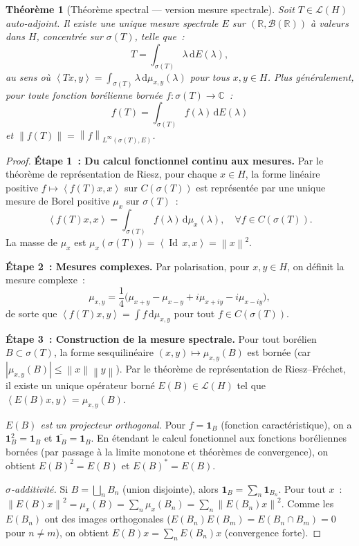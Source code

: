 \documentclass[a4paper,12pt]{book}
\DeclareMathOperator{\Id}{Id}
\newcommand{\R}{\mathbb{R}}
\newcommand{\C}{\mathbb{C}}
\newcommand{\dd}{\mathrm{d}}
\newcommand{\norm}[1]{\left\| #1 \right\|}
\newcommand{\abs}[1]{\left| #1 \right|}
\newcommand{\inner}[2]{\left\langle #1, #2 \right\rangle}
\theoremstyle{definition}
\theoremstyle{plain}
\newtheorem{theoreme}[definition]{Théorème}
\theoremstyle{remark}
\begin{document}
\begin{theoreme}[Théorème spectral --- version mesure spectrale]
\label{thm:spectral-mesure}
Soit $T \in \mathcal{L}(H)$ auto-adjoint. Il existe une unique mesure spectrale $E$ sur
$(\R, \mathcal{B}(\R))$ à valeurs dans $H$, concentrée sur $\sigma(T)$, telle que~:
\[
  T = \int_{\sigma(T)} \lambda \, \dd E(\lambda),
\]
au sens où $\inner{Tx}{y} = \int_{\sigma(T)} \lambda \, \dd\mu_{x,y}(\lambda)$ pour
tous $x, y \in H$. Plus généralement, pour toute fonction borélienne bornée
$f : \sigma(T) \to \C$~:
\[
  f(T) = \int_{\sigma(T)} f(\lambda) \, \dd E(\lambda)
\]
et $\norm{f(T)} = \norm{f}_{L^\infty(\sigma(T), E)}$.
\end{theoreme}

\begin{proof}
\textbf{Étape 1~: Du calcul fonctionnel continu aux mesures.}
Par le théorème de représentation de Riesz,
pour chaque $x \in H$, la forme linéaire positive $f \mapsto \inner{f(T)x}{x}$ sur
$C(\sigma(T))$ est représentée par une unique mesure de Borel positive $\mu_x$ sur
$\sigma(T)$~:
\[
  \inner{f(T)x}{x} = \int_{\sigma(T)} f(\lambda)\, \dd\mu_x(\lambda),
  \quad \forall f \in C(\sigma(T)).
\]
La masse de $\mu_x$ est $\mu_x(\sigma(T)) = \inner{\Id\, x}{x} = \norm{x}^2$.

\textbf{Étape 2~: Mesures complexes.}
Par polarisation, pour $x, y \in H$, on définit la mesure complexe~:
\[
  \mu_{x,y} = \frac{1}{4}\bigl(\mu_{x+y} - \mu_{x-y}
    + i\mu_{x+iy} - i\mu_{x-iy}\bigr),
\]
de sorte que $\inner{f(T)x}{y} = \int f\, \dd\mu_{x,y}$ pour tout $f \in C(\sigma(T))$.

\textbf{Étape 3~: Construction de la mesure spectrale.}
Pour tout borélien $B \subset \sigma(T)$, la forme sesquilinéaire
$(x,y) \mapsto \mu_{x,y}(B)$ est bornée (car $\abs{\mu_{x,y}(B)} \le \norm{x}\norm{y}$).
Par le théorème de représentation de Riesz--Fréchet, il existe un unique opérateur borné
$E(B) \in \mathcal{L}(H)$ tel que $\inner{E(B)x}{y} = \mu_{x,y}(B)$.

\emph{$E(B)$ est un projecteur orthogonal.} Pour $f = \mathbf{1}_B$ (fonction
caractéristique), on a $\mathbf{1}_B^2 = \mathbf{1}_B$ et
$\overline{\mathbf{1}_B} = \mathbf{1}_B$. En étendant le calcul fonctionnel aux fonctions
boréliennes bornées (par passage à la limite monotone et théorèmes de convergence), on
obtient $E(B)^2 = E(B)$ et $E(B)^* = E(B)$.

\emph{$\sigma$-additivité.} Si $B = \bigsqcup_n B_n$ (union disjointe), alors
$\mathbf{1}_B = \sum_n \mathbf{1}_{B_n}$. Pour tout $x$~:
$\norm{E(B)x}^2 = \mu_x(B) = \sum_n \mu_x(B_n) = \sum_n \norm{E(B_n)x}^2$. Comme les
$E(B_n)$ ont des images orthogonales ($E(B_n)E(B_m) = E(B_n \cap B_m) = 0$ pour
$n \neq m$), on obtient $E(B)x = \sum_n E(B_n)x$ (convergence forte).


\end{proof}
\end{document}
